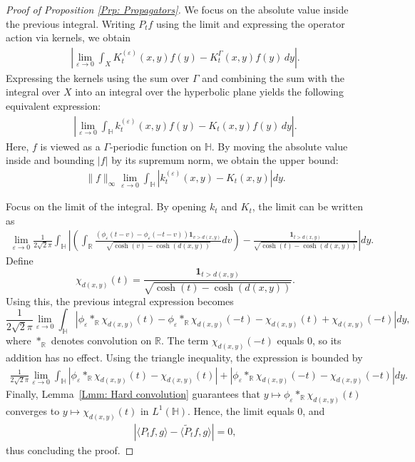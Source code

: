 \documentclass[11pt,twoside,reqno]{amsart} \usepackage{a4wide} \usepackage[T1]{fontenc} \usepackage[utf8]{inputenc} \usepackage{soul}  \usepackage{amsmath} \usepackage{amsfonts} \usepackage{amssymb} \usepackage{mathtools} \usepackage{amsthm} \usepackage{xcolor} \usepackage{graphicx} \usepackage{hyperref} \usepackage{standalone} \usepackage{esint} \usepackage{comment} \usepackage[left=2.3cm,top=3cm,right=2.3cm]{geometry} \usepackage{bm} \usepackage{svg} \usepackage{float} \numberwithin{equation}{section} \theoremstyle{plain} \newtheorem{thm}{Theorem}[section] \newtheorem{theorem}[thm]{Theorem} \newtheorem*{theorem*}{Theorem}\newtheorem{conj}[thm]{Conjecture} \newtheorem{lemma}[thm]{Lemma} \newtheorem{prop}[thm]{Proposition} \newtheorem{proposition}[thm]{Proposition} \newtheorem{cor}[thm]{Corollary} \newtheorem{question}[thm]{Question} \newtheorem{corollary}[thm]{Corollary} \newtheorem{assumption}[thm]{Assumption} \theoremstyle{definition} \newtheorem{defn}[thm]{Definition} \newtheorem{choice}[thm]{Choice} \newtheorem{definition}[thm]{Definition} \newtheorem{ex}[thm]{Example} \newtheorem{notation}[thm]{Notation} \newtheorem*{ack}{Acknowledgements} \theoremstyle{remark} \newtheorem{remark}[thm]{Remark} \newtheorem{bigremark}[thm]{Remark} \usepackage{xcolor} \newcommand{\red}[1]{ {\color{Red}#1} } \newcommand{\blue}[1]{ {\color{Blue}#1} } \author{Kai Hippi} \address{Aalto University, Espoo, Finland} \email{kai.hippi@aalto.fi}
\begin{document}
\begin{proof}[Proof of Proposition \ref{Prp: Propagators}]
We focus on the absolute value inside the previous integral. Writing \(P_t f\) using the limit and expressing the operator action via kernels, we obtain
\begin{align*}
	\left| \lim_{\varepsilon \to 0} \int_{X} K_{t}^{(\varepsilon)}(x,y) f(y) - K_{t}^{\Gamma}(x,y) f(y) \, dy \right|.
\end{align*}
Expressing the kernels using the sum over \( \Gamma \) and combining the sum with the integral over \( X \) into an integral over the hyperbolic plane yields the following equivalent expression:
\begin{align*}
	\left| \lim_{\varepsilon \to 0} \int_{\mathbb{H}} k_{t}^{(\varepsilon)}(x,y) f(y) - K_{t}(x,y) f(y) \, dy \right|.
\end{align*}
Here, $f$ is viewed as a $\Gamma$-periodic function on $\mathbb{H}$. By moving the absolute value inside and bounding \( |f| \) by its supremum norm, we obtain the upper bound:
\begin{align*}
	\| f \|_{\infty} \lim_{\varepsilon \to 0} \int_{\mathbb{H}} \left| k_{t}^{(\varepsilon)}(x,y) - K_{t}(x,y) \right| dy.
\end{align*}

Focus on the limit of the integral. By opening $k_t$ and $K_t$, the limit can be written as
\begin{align*}
	\lim_{\varepsilon \to 0} \frac{1}{2 \sqrt{2} \pi} \int_{\mathbb{H}} \left| \left( \int_{\mathbb{R}} \frac{ (\phi_\varepsilon(t-v) - \phi_\varepsilon(-t-v)) \mathbf{1}_{v > d(x,y)}}{\sqrt{\cosh(v) - \cosh(d(x,y))}} dv \right) - \frac{\mathbf{1}_{t > d(x,y)}}{\sqrt{\cosh(t) - \cosh(d(x,y))}} \right| dy.
\end{align*}
Define
$$
\chi_{d(x,y)}(t) = \frac{\mathbf{1}_{t > d(x,y)}}{\sqrt{\cosh(t) - \cosh(d(x,y))}}.
$$
Using this, the previous integral expression becomes
$$
\frac{1}{2 \sqrt{2} \pi} \lim_{\varepsilon \to 0} \int_{\mathbb{H}} \left| \phi_\varepsilon \ast_\mathbb{R} \chi_{d(x,y)}(t) - \phi_\varepsilon \ast_\mathbb{R} \chi_{d(x,y)}(-t) - \chi_{d(x,y)}(t) + \chi_{d(x,y)}(-t) \right| dy,
$$
where $\ast_{\mathbb{R}}$ denotes convolution on $\mathbb{R}$. The term $\chi_{d(x,y)}(-t)$ equals $0$, so its addition has no effect. Using the triangle inequality, the expression is bounded by
\begin{align*}
	\frac{1}{2 \sqrt{2} \pi} \lim_{\varepsilon \to 0} \int_{\mathbb{H}} \left| \phi_\varepsilon \ast_\mathbb{R} \chi_{d(x,y)}(t) - \chi_{d(x,y)}(t) \right| + \left| \phi_\varepsilon \ast_\mathbb{R} \chi_{d(x,y)}(-t) - \chi_{d(x,y)}(-t) \right| dy.
\end{align*}
Finally, Lemma~\ref{Lmm: Hard convolution} guarantees that $y \mapsto \phi_\varepsilon \ast_{\mathbb{R}} \chi_{d(x,y)}(t)$ converges to $y \mapsto \chi_{d(x,y)}(t)$ in $L^1(\mathbb{H})$. Hence, the limit equals $0$, and
\begin{align*}
	\left| \langle P_{t} f, g \rangle - \langle \tilde{P}_{t} f, g \rangle \right| = 0,
\end{align*}
thus concluding the proof.
\end{proof}
\end{document}
